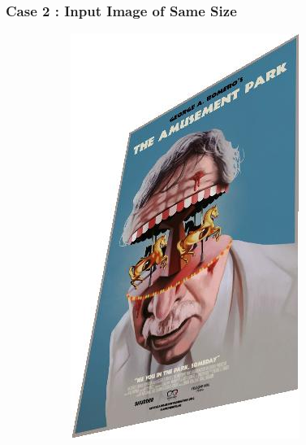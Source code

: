 \documentclass{article}
\begin{document}
\subsubsection{Case 2 : Input Image of Same Size}
\begin{figure}[H]
    \centering
    \begin{subfigure}{.3\textwidth}
        \centering
        \includegraphics[scale=0.5]{q2/output/transform_same.jpg}
    \end{subfigure}
    \begin{subfigure}{.3\textwidth}
        \centering

\end{subfigure}
\end{figure}
\end{document}

